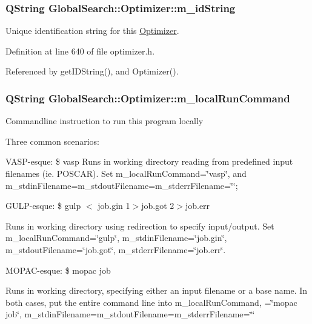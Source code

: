 \subsubsection[{m\+\_\+id\+String}]{\setlength{\rightskip}{0pt plus 5cm}Q\+String Global\+Search\+::\+Optimizer\+::m\+\_\+id\+String\hspace{0.3cm}{\ttfamily [protected]}}\label{classGlobalSearch_1_1Optimizer_a4d2dc8b7aaa3bb6fed8c28547460def8}
Unique identification string for this \hyperlink{classGlobalSearch_1_1Optimizer}{Optimizer}. 

Definition at line 640 of file optimizer.\+h.



Referenced by get\+I\+D\+String(), and Optimizer().

\hypertarget{classGlobalSearch_1_1Optimizer_a1cdb6b6c5e929e84c834ba93148fb31e}{}
\subsubsection[{m\+\_\+local\+Run\+Command}]{\setlength{\rightskip}{0pt plus 5cm}Q\+String Global\+Search\+::\+Optimizer\+::m\+\_\+local\+Run\+Command\hspace{0.3cm}{\ttfamily [protected]}}\label{classGlobalSearch_1_1Optimizer_a1cdb6b6c5e929e84c834ba93148fb31e}
Commandline instruction to run this program locally

Three common scenarios\+:

V\+A\+S\+P-\/esque\+: \$ vasp Runs in working directory reading from predefined input filenames (ie. P\+O\+S\+C\+A\+R). Set m\+\_\+local\+Run\+Command=\char`\"{}vasp\char`\"{}, and m\+\_\+stdin\+Filename=m\+\_\+stdout\+Filename=m\+\_\+stderr\+Filename=\char`\"{}\char`\"{};

G\+U\+L\+P-\/esque\+: \$ gulp $<$ job.\+gin 1$>$job.\+got 2$>$job.\+err

Runs in working directory using redirection to specify input/output. Set m\+\_\+local\+Run\+Command=\char`\"{}gulp\char`\"{}, m\+\_\+stdin\+Filename=\char`\"{}job.\+gin\char`\"{}, m\+\_\+stdout\+Filename=\char`\"{}job.\+got\char`\"{}, m\+\_\+stderr\+Filename=\char`\"{}job.\+err\char`\"{}.

M\+O\+P\+A\+C-\/esque\+: \$ mopac job

Runs in working directory, specifying either an input filename or a base name. In both cases, put the entire command line into m\+\_\+local\+Run\+Command, =\char`\"{}mopac job\char`\"{}, m\+\_\+stdin\+Filename=m\+\_\+stdout\+Filename=m\+\_\+stderr\+Filename=\char`\"{}\char`\"{}

